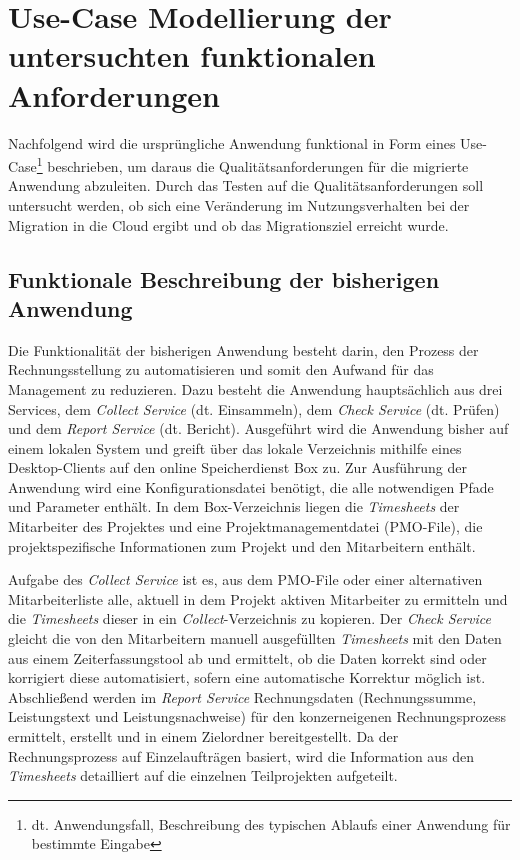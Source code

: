 \section{Use-Case Modellierung der untersuchten funktionalen Anforderungen}
\label{sec:use-case-modellierung}

Nachfolgend wird die ursprüngliche Anwendung funktional in Form eines Use-Case\footnote{dt. Anwendungsfall, Beschreibung des typischen Ablaufs einer Anwendung für bestimmte Eingabe} beschrieben, um daraus die Qualitätsanforderungen für die migrierte Anwendung abzuleiten. Durch das Testen auf die Qualitätsanforderungen soll untersucht werden, ob sich eine Veränderung im Nutzungsverhalten bei der Migration in die Cloud ergibt und ob das Migrationsziel erreicht wurde.

\subsection{Funktionale Beschreibung der bisherigen Anwendung}
Die Funktionalität der bisherigen Anwendung besteht darin, den Prozess der Rechnungsstellung zu automatisieren und somit den Aufwand für das Management zu reduzieren. Dazu besteht die Anwendung hauptsächlich aus drei Services, dem \textit{Collect Service} (dt. Einsammeln), dem \textit{Check Service} (dt. Prüfen) und dem \textit{Report Service} (dt. Bericht). Ausgeführt wird die Anwendung bisher auf einem lokalen System und greift über das lokale Verzeichnis mithilfe eines Desktop-Clients auf den online Speicherdienst \gls{Box} zu. Zur Ausführung der Anwendung wird eine Konfigurationsdatei benötigt, die alle notwendigen Pfade und Parameter enthält. In dem \gls{Box}-Verzeichnis liegen die \textit{\glspl{Timesheet}} der Mitarbeiter des Projektes und eine Projektmanagementdatei (PMO-File), die projektspezifische Informationen zum Projekt und den Mitarbeitern enthält.

Aufgabe des \textit{Collect Service} ist es, aus dem PMO-File oder einer alternativen Mitarbeiterliste alle, aktuell in dem Projekt aktiven Mitarbeiter zu ermitteln und die \textit{\glspl{Timesheet}} dieser in ein \textit{Collect}-Verzeichnis zu kopieren. Der \textit{Check Service} gleicht die von den Mitarbeitern manuell ausgefüllten \textit{\glspl{Timesheet}} mit den Daten aus einem Zeiterfassungstool ab und ermittelt, ob die Daten korrekt sind oder korrigiert diese automatisiert, sofern eine automatische Korrektur möglich ist. Abschließend werden im \textit{Report Service} Rechnungsdaten (Rechnungssumme, Leistungstext und Leistungsnachweise) für den konzerneigenen Rechnungsprozess ermittelt, erstellt und in einem Zielordner bereitgestellt. Da der Rechnungsprozess auf Einzelaufträgen basiert, wird die Information aus den \textit{\glspl{Timesheet}} detailliert auf die einzelnen Teilprojekten aufgeteilt.

